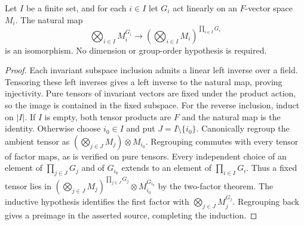\begin{lemma}
\label{lem:finite-independent-tensor-invariants}
\leanok
Let $I$ be a finite set, and for each $i\in I$ let $G_i$ act linearly
on an $F$-vector space $M_i$. The natural map
\[
 \bigotimes_{i\in I}M_i^{G_i}\longrightarrow
 \left(\bigotimes_{i\in I}M_i\right)^{\prod_{i\in I}G_i}
\]
is an isomorphism. No dimension or group-order hypothesis is required.
\end{lemma}
\begin{proof}
Each invariant subspace inclusion admits a linear left inverse over a
field. Tensoring these left inverses gives a left inverse to the natural
map, proving injectivity. Pure tensors of invariant vectors are fixed
under the product action, so the image is contained in the fixed subspace.
For the reverse inclusion, induct on $|I|$. If $I$ is empty, both tensor
products are $F$ and the natural map is the identity. Otherwise choose
$i_0\in I$ and put $J=I\setminus\{i_0\}$. Canonically regroup the ambient
tensor as $(\bigotimes_{j\in J}M_j)\otimes M_{i_0}$. Regrouping commutes
with every tensor of factor maps, as is verified on pure tensors.
Every independent choice of an element of $\prod_{j\in J}G_j$ and of
$G_{i_0}$ extends to an element of $\prod_{i\in I}G_i$. Thus a fixed
tensor lies in
$(\bigotimes_{j\in J}M_j)^{\prod_{j\in J}G_j}\otimes M_{i_0}^{G_{i_0}}$
by the two-factor theorem. The inductive hypothesis identifies the first
factor with $\bigotimes_{j\in J}M_j^{G_j}$. Regrouping back gives a
preimage in the asserted source, completing the induction.
\end{proof}


